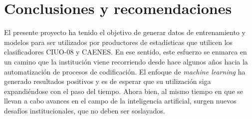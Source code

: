 \documentclass[
  12pt,
  spanish,
]{article}
\begin{document}
\newpage

\hypertarget{conclusiones-y-recomendaciones}{%
\section{Conclusiones y
recomendaciones}\label{conclusiones-y-recomendaciones}}

El presente proyecto ha tenido el objetivo de generar datos de
entrenamiento y modelos para ser utilizados por productores de
estadísticas que utilicen los clasificadores CIUO-08 y CAENES. En ese
sentido, este esfuerzo se enmarca en un camino que la institución viene
recorriendo desde hace algunos años hacia la automatización de procesos
de codificación. El enfoque de \emph{machine learning} ha generado
resultados positivos y es de esperar que su utilización siga
expandiéndose con el paso del tiempo. Ahora bien, al mismo tiempo en que
se llevan a cabo avances en el campo de la inteligencia artificial,
surgen nuevos desafíos institucionales, que no deben ser soslayados.
\end{document}
